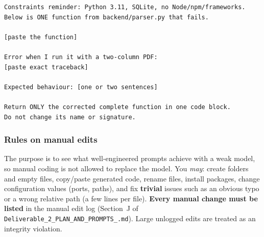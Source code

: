 \documentclass[11pt,a4paper]{article}
\newcommand{\uid}{[HeUserID]}
\newcommand{\dB}{\texttt{Deliverable\_2\_\allowbreak PLAN\_AND\_PROMPTS\_\allowbreak\uid.md}}
\begin{document}
\begin{tcolorbox}[enhanced,breakable,colback=white,colframe=black!40,boxrule=0.5pt,arc=2pt,title={\bfseries Debugging prompt template},fonttitle=\small\bfseries]
\begin{lstlisting}[frame=none,backgroundcolor=\color{white},xleftmargin=0pt]
Constraints reminder: Python 3.11, SQLite, no Node/npm/frameworks.
Below is ONE function from backend/parser.py that fails.

[paste the function]

Error when I run it with a two-column PDF:
[paste exact traceback]

Expected behaviour: [one or two sentences]

Return ONLY the corrected complete function in one code block.
Do not change its name or signature.
\end{lstlisting}
\end{tcolorbox}

\subsubsection{Rules on manual edits}
The purpose is to see what well-engineered prompts achieve with a weak model, so manual coding is not allowed to replace the model. You \emph{may}: create folders and empty files, copy/paste generated code, rename files, install packages, change configuration values (ports, paths), and fix \textbf{trivial} issues such as an obvious typo or a wrong relative path (a few lines per file). \textbf{Every manual change must be listed} in the manual edit log (Section~J of \dB). Large unlogged edits are treated as an integrity violation.
\end{document}
